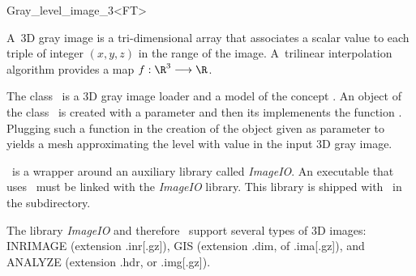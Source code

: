 

\begin{ccRefClass}{Gray_level_image_3<FT>}  %


\ccDefinition

 A~3D gray image is a
tri-dimensional array that associates a scalar value to each triple of
integer $(x, y, z)$ in the range of the image. A~trilinear interpolation
algorithm provides a map \begin{math}f : \R^3 \longrightarrow \R\end{math}.

The class \ccRefName\ is a 3D gray image loader and a model
of the concept .
An object of the class \ccRefName\  is created with a parameter
 and then its   implemenents
the function .
Plugging such a function in the creation of the 
object given as parameter  to  yields
a mesh approximating the level with value 
in the input 3D gray image.
 


\ccRefName\ is a wrapper around an auxiliary library called
\emph{ImageIO}. An executable that uses \ccRefName\ must be linked with the \emph{ImageIO}
library. This library is shipped with \cgal\ in the
 subdirectory.

The library \emph{ImageIO} and therefore \ccRefName\ support
several types of 3D images: INRIMAGE (extension .inr[.gz]), GIS (extension
.dim, of .ima[.gz]), and ANALYZE (extension .hdr, or .img[.gz]).



\end{ccRefClass}
